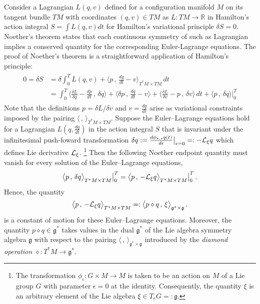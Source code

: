 \documentclass[11pt, oneside]{article}   	%
\numberwithin{equation}{section}
\theoremstyle{plain}
\theoremstyle{definition}
\theoremstyle{remark}
\newcommand{\<}{\langle}
\renewcommand{\>}{\rangle}
\newcommand{\scp}[2]{{\big\langle {#1}\, , \, {#2}\big\rangle}}
\begin{document}
Consider a Lagrangian $L(q,v)$ defined for a configuration manifold $M$ on its tangent bundle $TM$ with coordinates $(q,v)\in TM$ as  $L:TM\to \mathbb{R}$ in Hamilton's action integral $S=\int L(q,v)dt$ for Hamilton's variational principle $\delta S = 0$. Noether's theorem \cite{noether1918invariante} states that each continuous symmetry of such as Lagrangian implies a conserved quantity for the corresponding Euler-Lagrange equations. The proof of Noether's theorem is a straightforward application of Hamilton's principle:
\begin{align}
\begin{split}
0 = \delta S &= \delta \int_0^T L(q,v) + \scp{p}{\frac{dq}{dt}-v}_{T^*M\times TM}\,dt 
\\&= \int_0^T \scp{\frac{\delta L}{\delta q}-\frac{dp}{dt}}{\delta q} + \scp{ \delta p }{ \frac{dq}{dt} - v } + \scp{ \frac{\delta L}{\delta v} - p } {\delta v} \,dt  + \scp{ p }{\delta q }\Big|_0^T
\end{split}
\label{Noether-proof}
\end{align}
Note that the definitions $p=\delta L / \delta v$ and $v=\frac{dq}{dt}$ arise as variational constraints imposed by the pairing $\scp{}{}_{T^*M\times TM}$. Suppose the Euler--Lagrange equations hold for a Lagrangian $L(q,\frac{dq}{dt})$ in the action integral $S$ that is invariant under the infinitesimal push-foward transformation $\delta q := \frac{d \phi_{*,\epsilon} q(t)}{d\epsilon}\big|_{\epsilon=0} =: -  {\cal L}_\xi q$ which defines Lie derivative ${\cal L}_\xi $.%
\footnote{The transformation $\phi_\epsilon: G\times M\to M$ is taken to be an action on $M$ of a Lie group $G$ with parameter $\epsilon=0$ at the identity. Consequently, the quantity $\xi$ is an arbitrary element of the Lie algebra $\xi\in T_eG=:\mathfrak{g}$.} 
Then the following Noether endpoint quantity must vanish for every solution of the Euler--Lagrange equations,
\begin{align}
\scp{ p }{\delta q }_{T^*M\times TM}\big|_0^T = \scp{ p }{-  {\cal L}_\xi q}_{T^*M\times TM}\big|_0^T 
\,.\label{Noether-quantity}
\end{align}
Hence,  the quantity 
\begin{align}
\scp{ p }{-  {\cal L}_\xi q}_{T^*M\times TM}=:\scp{p\diamond q}{\xi}_{\mathfrak{g}^*\times\mathfrak{g}}
\,.\label{momap}
\end{align}
is a constant of motion for these Euler--Lagrange equations.
Moreover, the quantity $p\diamond q\in\mathfrak{g}^*$ takes 
values in the dual $\mathfrak{g}^*$ of the Lie algebra symmetry algebra $\mathfrak{g}$ with respect to the pairing 
$\scp{}{}_{\mathfrak{g}^*\times\mathfrak{g}}$ introduced by the \emph{diamond operation} $\diamond: T^*M\to \mathfrak{g}^*$. 
   
\end{document}
